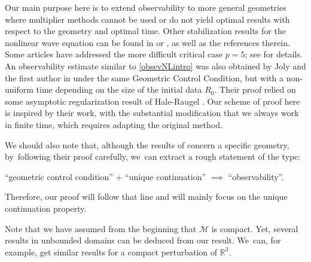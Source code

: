 \documentclass[JEP,XML,SOM,Unicode,published]{cedram}
\theoremstyle{definition}
\let\mc\mathcal
\newcommand{\M}{\mc{M}}
\newcommand{\R}{\mathbb{R}}
\begin{document}
Our main purpose here is to extend observability to more general geometries where multiplier methods cannot be used or do not yield optimal results with respect to the geometry and optimal time. Other stabilization results for the nonlinear wave equation can be found in \cite{AIN:11} or \cite{Per26}, as well as the references therein. Some articles have addressed the more difficult critical case $p=5$; see \cite{L:11} for details. An observability estimate similar to \eqref{obsevNLintro} was also obtained by Joly and the first author in \cite{JL13} under the same Geometric Control Condition, but with a non-uniform time depending on the size of the initial data $R_0$. Their proof relied on some asymptotic regularization result of Hale-Raugel \cite{HR03}. Our scheme of proof here is inspired by their work, with the substantial modification that we always work in finite time, which requires adapting the original method.

We should also note that, although the results of \cite{DLZ03} concern a specific geometry, by~following their proof carefully, we~can extract a rough statement of the type:
\begin{center}
``geometric control condition'' + ``unique continuation'' $\implies$ ``observability''.
\end{center}
Therefore, our proof will follow that line and will mainly focus on the unique continuation property.

Note that we have assumed from the beginning that $\M$ is compact. Yet, several results in unbounded domains can be deduced from our result. We~can, for example, get similar results for a compact perturbation of $\R^3$.
\end{document}
